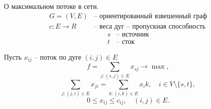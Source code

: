\begin{example}
    О максимальном потоке в сети.
    \[
        \begin{array}{ll}
            G = (V,E)          & \text{-- ориентированный взвешенный граф}    \\
            c: E \rightarrow R & \text{-- веса дуг -- пропускная способность}
        \end{array}
    \]
    \[
        \begin{array}{ll}
            s & \text{-- источник} \\
            t & \text{-- сток}
        \end{array}
    \]

    Пусть $ x_{ij} $ -- поток по дуге $ (i,j)\in E $
    \[
        f = \sum_{j: (s,j)\in E} x_{sj} \longrightarrow \max,
    \]
    \[
        \sum_{j:(j,i)\in E}x_{ji} = \sum_{k:(i,k)\in E}x_ik, \quad i \in V \setminus\{s,t\},
    \]
    \[
        0 \leqslant x_{ij} \leqslant c_{ij}, \quad (i,j) \in E.
    \]
\end{example}